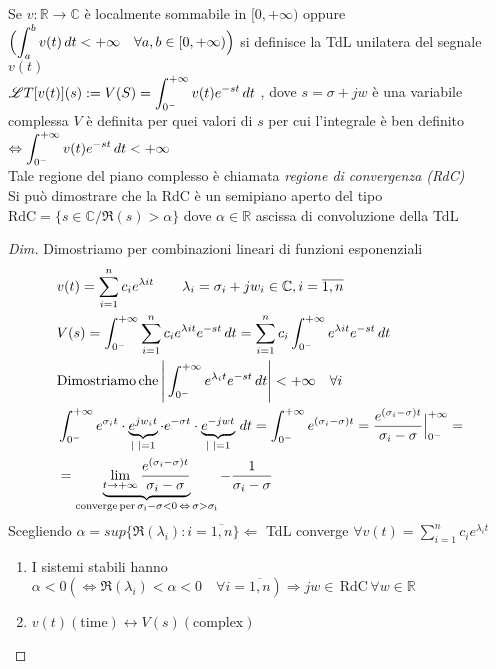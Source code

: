 \begin{definizione}
   Se $v:\mathbb{R}\to\mathbb{C}$ è localmente sommabile in $[0, +\infty)$ oppure \\$\Bigl(\displaystyle\int_a^bv(t)\,dt < +\infty\quad\forall a,b \in[0, +\infty)\Bigr)$ si definisce la TdL unilatera del segnale $v(t)$\\
   $\displaystyle\mathscr{L}T[v(t)](s) := V(S) = \int_{0^-}^{+\infty} v(t)e^{-st}\,dt$ , dove $s = \sigma + jw$ è una variabile complessa
   $V$ è definita per quei valori di $s$ per cui l'integrale è ben definito\\ $\displaystyle\Leftrightarrow \int_{0^-}^{+\infty} v(t)e^{-st}\,dt < +\infty$\\
   Tale regione del piano complesso è chiamata \emph{regione di convergenza (RdC)}\\
   Si può dimostrare che la RdC è un semipiano aperto del tipo \\$\mathrm{RdC} = \{s\in\mathbb{C}/\Re(s)>\alpha\}$ dove $\alpha\in\mathbb{R}$ ascissa di convoluzione della TdL
   \begin{proof}[Dim]
      Dimostriamo per combinazioni lineari di funzioni esponenziali
      \[
         \begin{split}
            & v(t) = \sum_{i = 1}^nc_ie^{\lambda it} \qquad \lambda_i = \sigma_i + jw_i\in\mathbb{C}, i = \overline{1,n}\\
            & V(s) = \int_{0^-}^{+\infty} \sum_{i = 1}^nc_ie^{\lambda it}e^{-st}\,dt = \sum_{i = 1}^nc_i\int_{0^-}^{+\infty} e^{\lambda it}e^{-st}\,dt\\
            & \mathrm{Dimostriamo\, che\, } \Bigg\lvert\int_{0^-}^{+\infty} e^{\lambda_it}e^{-st}\,dt\Bigg\rvert < +\infty\quad\forall i \\
            & \int_{0^-}^{+\infty} e^{\sigma_it}\cdot \underbrace{e^{jw_it}}_{\lvert\,\,\rvert = 1}\cdot e^{-\sigma t}\cdot \underbrace{e^{-jwt}}_{\lvert\,\,\rvert = 1}\,dt = \int_{0^-}^{+\infty} e^{(\sigma_i - \sigma)t} = \frac{e^{(\sigma_i - \sigma)t}}{\sigma_i - \sigma}\Big|_{0^-}^{+\infty} =\\
            & = \underbrace{\lim_{t\to+\infty}\frac{e^{(\sigma_i - \sigma)t}}{\sigma_i - \sigma}}_{\mathrm{converge\, per\, \sigma_i - \sigma < 0 \,\Leftrightarrow\, \sigma > \sigma_i}} - \frac{1}{\sigma_i - \sigma}
         \end{split}
      \]
      Scegliendo $\alpha = sup\{\Re(\lambda_i) : i = \overline{1,n}\} \Leftarrow$ TdL converge $\displaystyle\forall v(t) = \sum_{i = 1}^nc_ie^{\lambda_it}$ \AdC
      \begin{osservazione}
         \begin{enumerate}
            \item I sistemi stabili hanno $\displaystyle \alpha < 0(\Leftrightarrow \Re(\lambda_i) < \alpha < 0\quad \forall i = \overline{1,n}) \Rightarrow jw\in\mathrm{\,RdC\,}\forall w\in\mathbb{R}$
            \item $v(t) (\mathrm{time}) \leftrightarrow V(s)(\mathrm{complex})$
         \end{enumerate}
      \end{osservazione}
   \end{proof}
\end{definizione}

